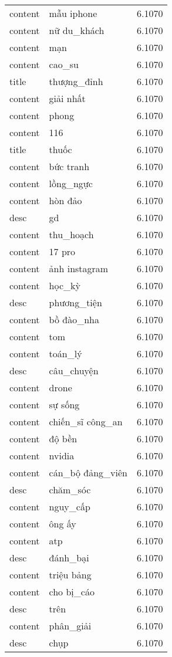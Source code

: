 \documentclass{article}
\begin{document}
\begin{tabular}{lll}
content & mẫu iphone & 6.1070\\
content & nữ du\_khách & 6.1070\\
content & mạn & 6.1070\\
content & cao\_su & 6.1070\\
title & thượng\_đỉnh & 6.1070\\
content & giải nhất & 6.1070\\
content & phong & 6.1070\\
content & 116 & 6.1070\\
title & thuốc & 6.1070\\
content & bức tranh & 6.1070\\
content & lồng\_ngực & 6.1070\\
content & hòn đảo & 6.1070\\
desc & gd & 6.1070\\
content & thu\_hoạch & 6.1070\\
content & 17 pro & 6.1070\\
content & ảnh instagram & 6.1070\\
content & học\_kỳ & 6.1070\\
desc & phương\_tiện & 6.1070\\
content & bồ đào\_nha & 6.1070\\
content & tom & 6.1070\\
content & toán\_lý & 6.1070\\
desc & câu\_chuyện & 6.1070\\
content & drone & 6.1070\\
content & sự sống & 6.1070\\
content & chiến\_sĩ công\_an & 6.1070\\
content & độ bền & 6.1070\\
content & nvidia & 6.1070\\
content & cán\_bộ đảng\_viên & 6.1070\\
desc & chăm\_sóc & 6.1070\\
content & nguy\_cấp & 6.1070\\
content & ông ấy & 6.1070\\
content & atp & 6.1070\\
desc & đánh\_bại & 6.1070\\
content & triệu bảng & 6.1070\\
content & cho bị\_cáo & 6.1070\\
desc & trên & 6.1070\\
content & phân\_giải & 6.1070\\
desc & chụp & 6.1070\\

\end{tabular}
\end{document}
